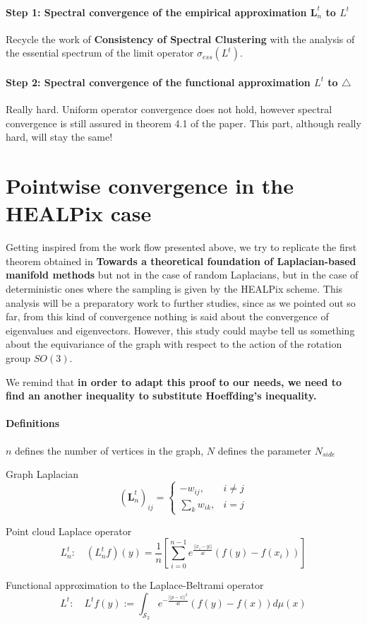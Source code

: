 \paragraph{Step 1: Spectral convergence of the empirical approximation $\mathbf{ L}_n^t$ to $L^t$}
Recycle the work of \textbf{Consistency of Spectral Clustering} with the analysis of the essential spectrum of the limit operator $\sigma_{ess}(L^t)$.
\paragraph{Step 2: Spectral convergence of the functional approximation $L^t$ to $\triangle$}
Really hard. Uniform operator convergence does not hold, however spectral convergence is still assured in theorem 4.1 of the paper. This part, although really hard, will stay the same!


\section{Pointwise convergence in the HEALPix case}

Getting inspired from the work flow presented above, we try to replicate the first theorem obtained in \textbf{Towards a theoretical foundation of Laplacian-based manifold methods} but not in the case of random Laplacians, but in the case of deterministic ones where the sampling is given by the HEALPix scheme. This analysis will be a preparatory work to further studies, since as we pointed out so far, from this kind of convergence nothing is said about the convergence of eigenvalues and eigenvectors. However, this study could maybe tell us something about the equivariance of the graph with respect to the action of the rotation group $SO(3)$.


We remind that \textbf{in order to adapt this proof to our needs, we need to find an another inequality to substitute Hoeffding's inequality.}


\paragraph{Definitions}

$n$ defines the number of vertices in the graph, $N$ defines the parameter $N_{side}$
\begin{definition}{Graph Laplacian}
	$$ \left(\mathbf L_n^t\right)_{ij}=\begin{cases}
	-w_{ij}, & i\neq j\\
	\sum_{k}w_{ik}, & i=j
	\end{cases}$$
\end{definition}
\begin{definition}{Point cloud Laplace operator}
	$$L_n^t:\quad(L_n^tf)(y) = \frac{1}{n}\left[ \sum_{i=0}^{n-1} e^\frac{||x_i-y||}{4t}\left(f(y)-f(x_i)\right)\right]$$
\end{definition}
\begin{definition}{Functional approximation to the Laplace-Beltrami operator} \label{eq: my L^t}
	$$L^t:\quad L^tf(y) := \int_{\mathcal S_2}e^{-\frac{||p-x||^2}{4t}}\left(f(y)-f(x)\right)d\mu(x)$$
\end{definition}

